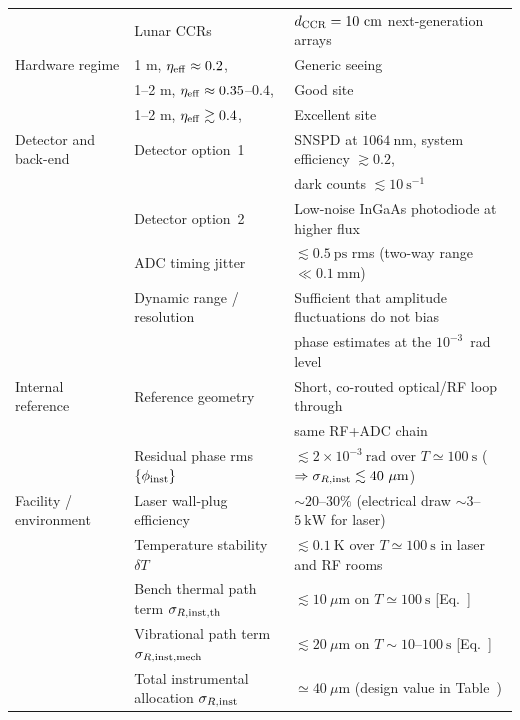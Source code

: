 \documentclass[11pt]{article}
\begin{document}
\begin{table}[htbp]
{\begin{tabular}{lll}
    &
    Lunar CCRs &
    $d_{\rm CCR}=10~\mathrm{cm}$ next-generation arrays \\[0.4em]
       Hardware regime 
         & 1 m, $\eta_{\rm eff} \approx 0.2$, & Generic seeing \\
         & 1--2 m, $\eta_{\rm eff} \approx 0.35$--$0.4$, & Good site \\
         & 1--2 m, $\eta_{\rm eff} \gtrsim 0.4$, & Excellent site \\[0.4em]
    Detector and back-end &
    Detector option~1 &
    SNSPD at $1064~\mathrm{nm}$, system efficiency $\gtrsim 0.2$, \\
    &&
    dark counts $\lesssim 10~\mathrm{s^{-1}}$ \\
    &
    Detector option~2 &
    Low-noise InGaAs photodiode at higher flux \\
    &
    ADC timing jitter &
    $\lesssim 0.5~\mathrm{ps}$ rms (two-way range $\ll 0.1~\mathrm{mm}$) \\
    &
    Dynamic range / resolution &
    Sufficient that amplitude fluctuations do not bias \\
    && phase
    estimates at the $10^{-3}$~rad level \\[0.4em]
    Internal reference &
    Reference geometry &
    Short, co-routed optical/RF loop through \\
    && same RF+ADC chain \\
    &
    Residual phase rms$\{\phi_{\rm inst}\}$ &
    $\lesssim 2\times 10^{-3}~\mathrm{rad}$ over $T\simeq 100~\mathrm{s}$
    ($\Rightarrow \sigma_{R,{\rm inst}}\lesssim 40~\mu\mathrm{m}$) \\[0.4em]
    Facility / environment &
    Laser wall-plug efficiency &
    $\sim 20$--$30\%$ (electrical draw $\sim 3$--$5~\mathrm{kW}$ for laser) \\
    &
    Temperature stability $\delta T$ &
    $\lesssim 0.1~\mathrm{K}$ over $T\simeq 100~\mathrm{s}$ in laser and RF rooms \\
    &
    Bench thermal path term $\sigma_{R,{\rm inst,th}}$ &
    $\lesssim 10~\mu\mathrm{m}$ on $T\simeq 100~\mathrm{s}$ [Eq.~] \\
    &
    Vibrational path term $\sigma_{R,{\rm inst,mech}}$ &
    $\lesssim 20~\mu\mathrm{m}$ on $T\sim 10$--$100~\mathrm{s}$ [Eq.~] \\
    &
    Total instrumental allocation $\sigma_{R,{\rm inst}}$ &
    $\simeq 40~\mu\mathrm{m}$ (design value in Table~) \\
    \hline
  \end{tabular}
}
\end{table}
\end{document}
